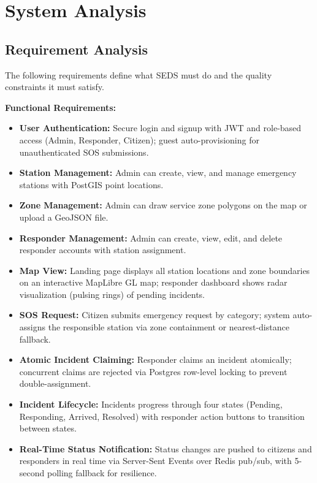 \chapter{System Analysis}

\section{Requirement Analysis}
The following requirements define what SEDS must do and the quality constraints it must satisfy.

\textbf{Functional Requirements:}
\begin{itemize}
  \item \textbf{User Authentication:} Secure login and signup with JWT and role-based access (Admin, Responder, Citizen); guest auto-provisioning for unauthenticated SOS submissions.
  \item \textbf{Station Management:} Admin can create, view, and manage emergency stations with PostGIS point locations.
  \item \textbf{Zone Management:} Admin can draw service zone polygons on the map or upload a GeoJSON file.
  \item \textbf{Responder Management:} Admin can create, view, edit, and delete responder accounts with station assignment.
  \item \textbf{Map View:} Landing page displays all station locations and zone boundaries on an interactive MapLibre GL map; responder dashboard shows radar visualization (pulsing rings) of pending incidents.
  \item \textbf{SOS Request:} Citizen submits emergency request by category; system auto-assigns the responsible station via zone containment or nearest-distance fallback.
  \item \textbf{Atomic Incident Claiming:} Responder claims an incident atomically; concurrent claims are rejected via Postgres row-level locking to prevent double-assignment.
  \item \textbf{Incident Lifecycle:} Incidents progress through four states (Pending, Responding, Arrived, Resolved) with responder action buttons to transition between states.
  \item \textbf{Real-Time Status Notification:} Status changes are pushed to citizens and responders in real time via Server-Sent Events over Redis pub/sub, with 5-second polling fallback for resilience.
\end{itemize}

